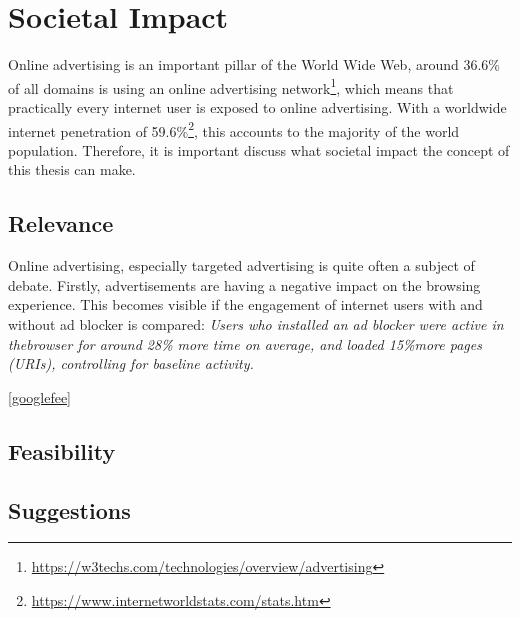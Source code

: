\chapter{Societal Impact}
\label{cha:societalimpact}

Online advertising is an important pillar of the World Wide Web, around 36.6\% of all domains is using an online advertising network\footnote{\url{https://w3techs.com/technologies/overview/advertising}}, which means that practically every internet user is exposed to online advertising. With a worldwide internet penetration of 59.6\%\footnote{\url{https://www.internetworldstats.com/stats.htm}}, this accounts to the majority of the world population. Therefore, it is important discuss what societal impact the concept of this thesis can make.

\section{Relevance}
Online advertising, especially targeted advertising is quite often a subject of debate. Firstly, advertisements are having a negative impact on the browsing experience. This becomes visible if the engagement of internet users with and without ad blocker is compared: \textit{Users who installed an ad blocker were active in thebrowser for around 28\% more time on average, and loaded 15\%more pages (URIs), controlling for baseline activity.}


\ref{googlefee}

\section{Feasibility}

\section{Suggestions}